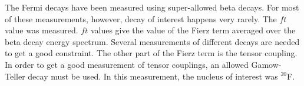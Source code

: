 \documentclass[main.tex]{subfiles}
\begin{document}
The Fermi decays have been measured using super-allowed beta decays.
For most of these measurements, however, decay of interest happens very rarely.
The $ft$ value was measured.
$ft$ values give the value of the Fierz term averaged over the beta decay energy spectrum.
Several measurements of different decays are needed to get a good constraint.
The other part of the Fierz term is the tensor coupling. 
In order to get a good measurement of  tensor couplings, an allowed Gamow-Teller decay must be used. 
In this measurement, the nucleus of interest was $^{20}$F.
 
\end{document}
